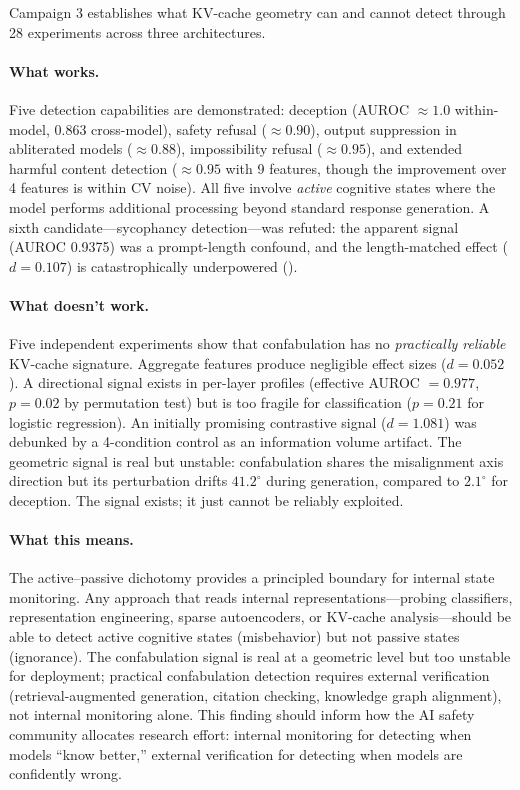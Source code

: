 Campaign 3 establishes what KV-cache geometry can and cannot detect through 28 experiments across three architectures.

\paragraph{What works.} Five detection capabilities are demonstrated: deception (AUROC $\approx 1.0$ within-model, $0.863$ cross-model), safety refusal ($\approx 0.90$), output suppression in abliterated models ($\approx 0.88$), impossibility refusal ($\approx 0.95$), and extended harmful content detection ($\approx 0.95$ with 9 features, though the improvement over 4 features is within CV noise). All five involve \emph{active} cognitive states where the model performs additional processing beyond standard response generation. A sixth candidate---sycophancy detection---was refuted: the apparent signal (AUROC 0.9375) was a prompt-length confound, and the length-matched effect ($d = 0.107$) is catastrophically underpowered ().

\paragraph{What doesn't work.} Five independent experiments show that confabulation has no \emph{practically reliable} KV-cache signature. Aggregate features produce negligible effect sizes ($d = 0.052$). A directional signal exists in per-layer profiles (effective AUROC $= 0.977$, $p = 0.02$ by permutation test) but is too fragile for classification ($p = 0.21$ for logistic regression). An initially promising contrastive signal ($d = 1.081$) was debunked by a 4-condition control as an information volume artifact. The geometric signal is real but unstable: confabulation shares the misalignment axis direction but its perturbation drifts $41.2^{\circ}$ during generation, compared to $2.1^{\circ}$ for deception. The signal exists; it just cannot be reliably exploited.

\paragraph{What this means.} The active--passive dichotomy provides a principled boundary for internal state monitoring. Any approach that reads internal representations---probing classifiers, representation engineering, sparse autoencoders, or KV-cache analysis---should be able to detect active cognitive states (misbehavior) but not passive states (ignorance). The confabulation signal is real at a geometric level but too unstable for deployment; practical confabulation detection requires external verification (retrieval-augmented generation, citation checking, knowledge graph alignment), not internal monitoring alone. This finding should inform how the AI safety community allocates research effort: internal monitoring for detecting when models ``know better,'' external verification for detecting when models are confidently wrong.

